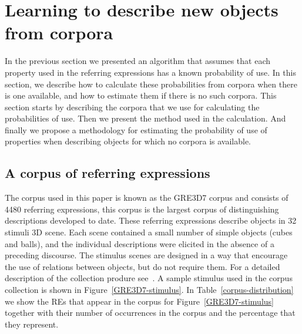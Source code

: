 \section{Learning to describe new objects from corpora}
\label{sec:learning}

In the previous section we presented an algorithm that assumes that each property used in the referring expressions has a known probability of use. In this section, we describe how to calculate these probabilities from corpora when there is one available, and how to estimate them if there is no such corpora. This section starts by describing the corpora that we use for calculating the probabilities of use. Then we present the method used in the calculation. And finally we propose a methodology for estimating the probability of use of properties when describing objects for which no corpora is available. 

\subsection{A corpus of referring expressions}

The corpus used in this paper is known as the GRE3D7 corpus and consists of 4480 referring expressions, this corpus is the largest corpus of distinguishing descriptions developed to date. These referring expressions describe objects in 32 stimuli 3D scene. Each scene contained a small number of simple objects (cubes and balls), and the individual descriptions were elicited in the absence of a preceding discourse. The stimulus scenes are designed in a way that encourage the use of relations between objects, but do not require them. For a detailed description of the collection produre see~\cite[Chapter 5]{viet:gene11}. A sample stimulus used in the corpus collection is shown in Figure~\ref{GRE3D7-stimulus}. In Table~\ref{corpus-distribution} we show the REs that appear in the corpus for Figure~\ref{GRE3D7-stimulus} together with their number of occurrences in the corpus and the percentage that they represent.  


